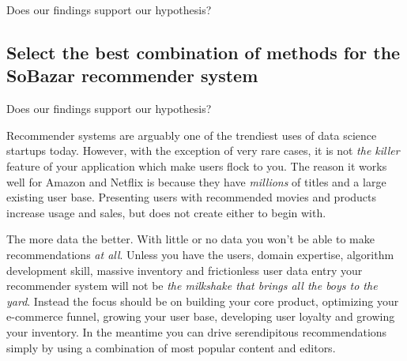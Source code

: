 Does our findings support our hypothesis?

\subsection{Select the best combination of methods for the SoBazar recommender system}

Does our findings support our hypothesis?












Recommender systems are arguably one of the trendiest uses of data science startups today. However, with the exception of very
rare cases, it is not \emph{the killer} feature of your application which make users flock to you. The reason it works
well for Amazon and Netflix is because they have \emph{millions} of titles and a large existing user base. Presenting users
with recommended movies and products increase usage and sales, but does not create either to begin with.

The more data the better. With little or no data you won't be able to make recommendations \emph{at all}. Unless you have the users, domain expertise, algorithm development skill, massive inventory and frictionless user data entry your recommender
system will not be \emph{the milkshake that brings all the boys to the yard}. Instead the focus should be on building your core product, optimizing your e-commerce funnel, growing your user base, developing user loyalty and growing your inventory. In the meantime you can drive serendipitous recommendations simply by using a combination of most popular content and editors.



